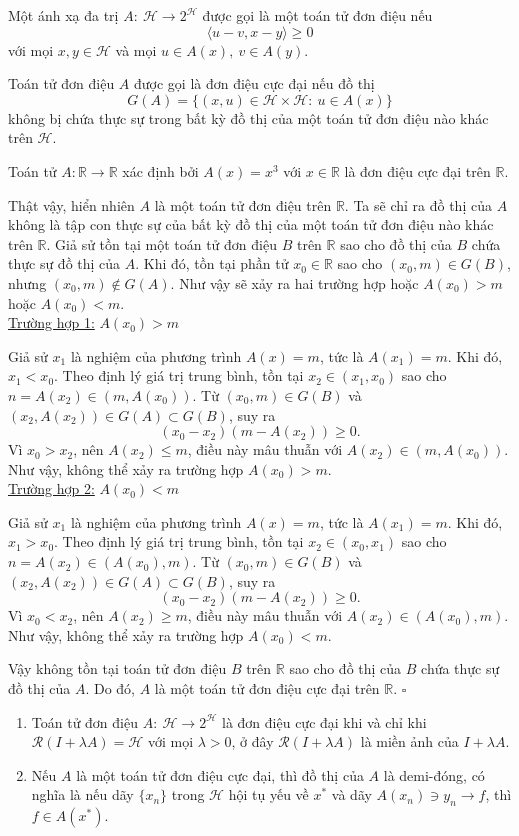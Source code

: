 \documentclass[14pt, oneside,A4paper]{book}
\theoremstyle{plain}
\newcommand{\eproof}{\hfill $\square$}
\begin{document}
\rm Một ánh xạ đa trị $A:\ \mathcal H\longrightarrow 2^{\mathcal H}$ được gọi là một toán tử đơn điệu nếu 
\begin{equation}
\langle u-v,x-y\rangle \geq 0
\end{equation}
với mọi $x,y\in \mathcal H$ và mọi $u\in A(x),\ v\in A(y)$.

Toán tử đơn điệu $A$ được gọi là đơn điệu cực đại nếu đồ thị
$$G(A)=\{(x,u)\in \mathcal H\times \mathcal H:\ u\in A(x)\}$$
không bị chứa thực sự trong bất kỳ đồ thị của một toán tử đơn điệu nào khác trên $\mathcal H$.

\vd\rm Toán tử $A:\mathbb R \to \mathbb R$ xác định bởi $A(x)=x^3$ với $x\in\mathbb R$ là đơn điệu cực đại trên $\mathbb R$.

Thật vậy, hiển nhiên $A$ là một toán tử đơn điệu trên $\mathbb R$. Ta sẽ chỉ ra đồ thị của $A$ không là tập con thực sự của bất kỳ đồ thị của một toán tử đơn điệu nào khác trên $\mathbb R$. Giả sử tồn tại một toán tử đơn điệu $B$ trên $\mathbb R$ sao cho đồ thị của $B$ chứa thực sự đồ thị của $A$. Khi đó, tồn tại phần tử $x_0\in\mathbb R$ sao cho $(x_0, m)\in G(B)$, nhưng $(x_0, m)\notin G(A)$. Như vậy sẽ xảy ra hai trường hợp hoặc $A(x_0)> m$ hoặc $A(x_0)<m$.\\
\underline{Trường hợp 1:} $A(x_0)> m$

Giả sử $x_1$ là nghiệm của phương trình $A(x)=m$, tức là $A(x_1)=m$. Khi đó, $x_1<x_0$. Theo định lý giá trị trung bình, tồn tại $x_2\in (x_1,x_0)$ sao cho $n=A(x_2)\in (m, A(x_0))$. Từ $(x_0, m)\in G(B)$ và $(x_2, A(x_2))\in G(A)\subset G(B)$, suy ra
$$(x_0-x_2)(m-A(x_2))\geq 0.$$
Vì $x_0>x_2$, nên $A(x_2)\leq m$, điều này mâu thuẫn với $A(x_2)\in (m, A(x_0))$. Như vậy, không thể xảy ra trường hợp $A(x_0)> m$.\\
\underline{Trường hợp 2:} $A(x_0)< m$

Giả sử $x_1$ là nghiệm của phương trình $A(x)=m$, tức là $A(x_1)=m$. Khi đó, $x_1>x_0$. Theo định lý giá trị trung bình, tồn tại $x_2\in (x_0,x_1)$ sao cho $n=A(x_2)\in (A(x_0),m)$. Từ $(x_0, m)\in G(B)$ và $(x_2, A(x_2))\in G(A)\subset G(B)$, suy ra
$$(x_0-x_2)(m-A(x_2))\geq 0.$$
Vì $x_0<x_2$, nên $A(x_2)\geq   m$, điều này mâu thuẫn với $A(x_2)\in (A(x_0),m)$. Như vậy, không thể xảy ra trường hợp $A(x_0)< m$.

Vậy không tồn tại toán tử đơn điệu $B$ trên $\mathbb R$ sao cho đồ thị của $B$ chứa thực sự đồ thị của $A$. Do đó, $A$ là một toán tử đơn điệu cực đại trên $\mathbb R$.
\eproof

\nx \rm \begin{enumerate}
	\item Toán tử đơn điệu $A:\ \mathcal H\longrightarrow 2^{\mathcal H}$ là đơn điệu cực đại khi và chỉ khi $\mathcal R(I+\lambda A)=\mathcal H$ với mọi $\lambda >0$, ở đây $\mathcal R(I+\lambda A)$ là miền ảnh của $I+\lambda A$.
\item Nếu $A$ là một toán tử đơn điệu cực đại, thì đồ thị của $A$ là demi-đóng, có nghĩa là nếu dãy $\{x_n\}$ trong $\mathcal H$ hội tụ yếu về $x^*$ và dãy $A(x_n)\ni y_n\longrightarrow f$, thì $f\in A(x^*)$.
\end{enumerate}
\end{document}

